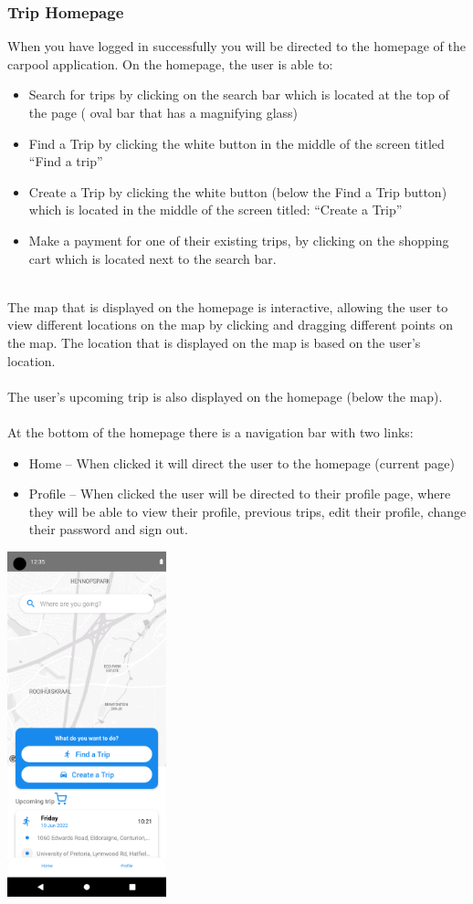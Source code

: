 \documentclass[hidelinks, 12pt, a4paper]{article}
\begin{document}
\subsubsection{Trip Homepage}
When you have logged in successfully you will be directed to the homepage of the carpool application.
On the homepage, the user is able to:
\begin{itemize}
  \item Search for trips by clicking on the search bar which is located at the top of the page ( oval bar that has a magnifying glass)
  \item Find a Trip   by clicking the white button in the middle of the screen titled “Find a trip”
  \item Create a Trip   by clicking the white button (below the Find a Trip button) which is located in the middle of the screen titled: “Create a Trip”
  \item Make a payment for one of their existing trips, by clicking on the shopping cart which is located next to the search bar.
\end{itemize}\\
The map that is displayed on the homepage is interactive, allowing the user to view different locations on the map by clicking and dragging different points on the map. The location that is displayed on the map is based on the user’s location.\\ \\
The user’s upcoming trip   is also displayed on the homepage (below the map). \\ \\
At the bottom of the homepage there is a navigation bar with two links:\\
\begin{itemize}
    \item Home – When clicked it will direct the user to the homepage (current page)
    \item Profile – When clicked the user will be directed to their profile page, where they will be able to view their profile, previous trips, edit their profile, change their password and sign out.
\end{itemize}
\begin{center}
  \includegraphics[height=10cm]{images/homepage.png}
\end{center}
\end{document}
